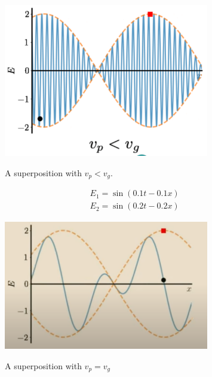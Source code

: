 \begin{figure}[H]
   \centering
    \includegraphics[width=0.8\textwidth]{lesson6/vp_less_vg.pdf}
    \label{fig: 1}
    \begin{center}
        \caption{A superposition with $v_p < v_g$.}
    \end{center}
\end{figure}

\begin{equation}
\begin{aligned}
&E_{1}=\sin (0.1 t-0.1 x) \\
&E_{2}=\sin (0.2 t-0.2 x)
\end{aligned}
\end{equation}

\begin{figure}[H]
   \centering
    \includegraphics[width=0.8\textwidth]{lesson6/vp_equal_vg.pdf}
    \label{fig: 1}
    \begin{center}
        \caption{A superposition with $v_p = v_g$}
    \end{center}
\end{figure}

